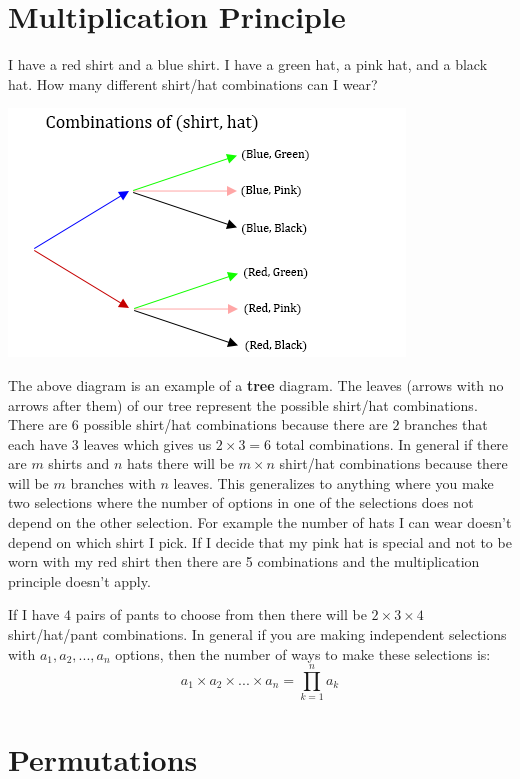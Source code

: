 \documentclass[
]{book}
\begin{document}
\hypertarget{multiplication-principle}{%
\section{Multiplication Principle}\label{multiplication-principle}}

I have a red shirt and a blue shirt. I have a green hat, a pink hat, and a black hat. How many different shirt/hat combinations can I wear?

\includegraphics{Pictures/02-Counting/Tree.PNG}

The above diagram is an example of a \textbf{tree} diagram. The leaves (arrows with no arrows after them) of our tree represent the possible shirt/hat combinations. There are \(6\) possible shirt/hat combinations because there are \(2\) branches that each have \(3\) leaves which gives us \(2 \times 3 = 6\) total combinations. In general if there are \(m\) shirts and \(n\) hats there will be \(m \times n\) shirt/hat combinations because there will be \(m\) branches with \(n\) leaves. This generalizes to anything where you make two selections where the number of options in one of the selections does not depend on the other selection. For example the number of hats I can wear doesn't depend on which shirt I pick. If I decide that my pink hat is special and not to be worn with my red shirt then there are 5 combinations and the multiplication principle doesn't apply.

If I have \(4\) pairs of pants to choose from then there will be \(2 \times 3 \times 4\) shirt/hat/pant combinations. In general if you are making independent selections with \(a_1,a_2,...,a_n\) options, then the number of ways to make these selections is:
\[a_1 \times a_2 \times ... \times a_n=\displaystyle\prod_{k=1}^{n} a_k\]

\hypertarget{permutations}{%
\section{Permutations}\label{permutations}}
\end{document}
